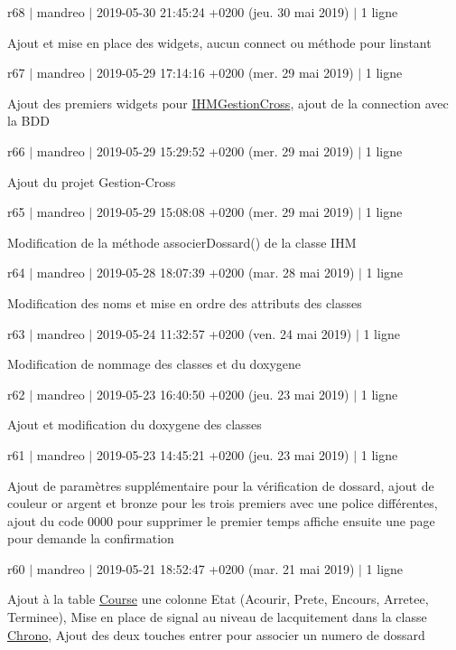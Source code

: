 r68 $\vert$ mandreo $\vert$ 2019-\/05-\/30 21\+:45\+:24 +0200 (jeu. 30 mai 2019) $\vert$ 1 ligne

Ajout et mise en place des widgets, aucun connect ou méthode pour l\textquotesingle{}instant

r67 $\vert$ mandreo $\vert$ 2019-\/05-\/29 17\+:14\+:16 +0200 (mer. 29 mai 2019) $\vert$ 1 ligne

Ajout des premiers widgets pour \hyperlink{class_i_h_m_gestion_cross}{I\+H\+M\+Gestion\+Cross}, ajout de la connection avec la B\+DD

r66 $\vert$ mandreo $\vert$ 2019-\/05-\/29 15\+:29\+:52 +0200 (mer. 29 mai 2019) $\vert$ 1 ligne

Ajout du projet Gestion-\/\+Cross

r65 $\vert$ mandreo $\vert$ 2019-\/05-\/29 15\+:08\+:08 +0200 (mer. 29 mai 2019) $\vert$ 1 ligne

Modification de la méthode associer\+Dossard() de la classe I\+HM

r64 $\vert$ mandreo $\vert$ 2019-\/05-\/28 18\+:07\+:39 +0200 (mar. 28 mai 2019) $\vert$ 1 ligne

Modification des noms et mise en ordre des attributs des classes

r63 $\vert$ mandreo $\vert$ 2019-\/05-\/24 11\+:32\+:57 +0200 (ven. 24 mai 2019) $\vert$ 1 ligne

Modification de nommage des classes et du doxygene

r62 $\vert$ mandreo $\vert$ 2019-\/05-\/23 16\+:40\+:50 +0200 (jeu. 23 mai 2019) $\vert$ 1 ligne

Ajout et modification du doxygene des classes

r61 $\vert$ mandreo $\vert$ 2019-\/05-\/23 14\+:45\+:21 +0200 (jeu. 23 mai 2019) $\vert$ 1 ligne

Ajout de paramètres supplémentaire pour la vérification de dossard, ajout de couleur or argent et bronze pour les trois premiers avec une police différentes, ajout du code \textquotesingle{}0000\textquotesingle{} pour supprimer le premier temps affiche ensuite une page pour demande la confirmation

r60 $\vert$ mandreo $\vert$ 2019-\/05-\/21 18\+:52\+:47 +0200 (mar. 21 mai 2019) $\vert$ 1 ligne

Ajout à la table \hyperlink{class_course}{Course} une colonne Etat (Acourir, Prete, Encours, Arretee, Terminee), Mise en place de signal au niveau de l\textquotesingle{}acquitement dans la classe \hyperlink{class_chrono}{Chrono}, Ajout des deux touches entrer pour associer un numero de dossard

